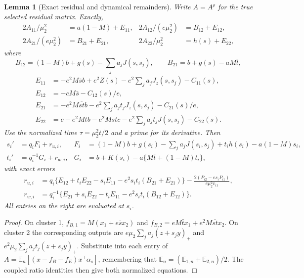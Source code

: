 \documentclass{article} %
\theoremstyle{plain}
\newtheorem{lemma}[theorem]{Lemma}
\theoremstyle{definition}
\theoremstyle{remark}
\begin{document}
\begin{lemma}[Exact residual and dynamical remainders]
\label{sbemp:exact-transfer}
Write $A=A^\rho$ for the true selected residual matrix. Exactly,
\begin{align*}
 2A_{11}/\mu_2^2&=a(1-M)+E_{11},&
 2A_{12}/(e\mu_2^2)&=B_{12}+E_{12},\\
 2A_{21}/(e\mu_2^2)&=B_{21}+E_{21},&
 2A_{22}/\mu_2^2&=h(s)+E_{22},
\end{align*}
where
\[
 B_{12}=(1-M)b+g(s)-\sum_j a_jJ(s,s_j),\qquad
 B_{21}=b+g(s)-aM\bar t,
\]
\begin{align*}
 E_{11}&=-e^2M\bar s b+e^2 Z(s)
             -e^2\sum_j a_jJ_z(s,s_j)-C_{11}(s),\\
 E_{12}&=-cM\bar s-C_{12}(s)/e,\\
 E_{21}&=-e^2M\overline{st}b
             -e^2\sum_j a_jt_jJ_z(s,s_j)-C_{21}(s)/e,\\
 E_{22}&=c-e^2M\bar t b-e^2M\overline{st}c
             -e^2\sum_j a_jt_jJ(s,s_j)-C_{22}(s).
\end{align*}
Use the normalized time $\tau=\mu_2^2t/2$ and a prime for its derivative.
Then
\begin{align}
 s_i'&=q_iF_i+r_{u,i},&
 F_i&=(1-M)b+g(s_i)-\sum_j a_jJ(s_i,s_j)
                  +t_i h(s_i)-a(1-M)s_i,\label{sbemp:input}\\
 t_i'&=q_i^{-1}G_i+r_{w,i},&
 G_i&=b+K(s_i)-a\{M\bar t+(1-M)t_i\},\label{sbemp:output}
\end{align}
with exact errors
\begin{align*}
 r_{u,i}&=q_i\{E_{12}+t_iE_{22}-s_iE_{11}
             -e^2s_it_i(B_{21}+E_{21})\}
             -\frac{2(P_{i2}-e s_iP_{i1})}{e\mu_2^2v_{i1}},\\
 r_{w,i}&=q_i^{-1}\{E_{21}+s_iE_{22}-t_iE_{11}
             -e^2s_it_i(B_{12}+E_{12})\}.
\end{align*}
All entries on the right are evaluated at $s_i$.
\end{lemma}
\begin{proof}
On cluster 1,
$f_{B,1}=M(x_1+e\bar s x_2)$ and
$f_{B,2}=eM\bar t x_1+e^2M\overline{st}x_2$.
On cluster 2 the corresponding outputs are
$e\mu_2\sum_j a_j(z+s_jy)_+$ and
$e^2\mu_2\sum_j a_jt_j(z+s_jy)_+$.
Substitute into each entry of
$A=\mathbb E_n[(x-f_B-f_E)x^\top\alpha_s]$, remembering that
$\mathbb E_n=(\mathbb E_{1,n}+\mathbb E_{2,n})/2$.
The coupled ratio identities then give both normalized equations.
\end{proof}
\end{document}
